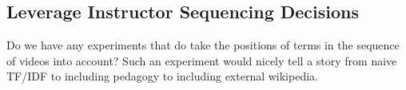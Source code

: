 \subsection{Leverage Instructor Sequencing Decisions}
\label{sec:useTime}

Do we have any experiments that do take the positions of terms in the
sequence of videos into account? Such an experiment would nicely tell
a story from naive TF/IDF to including pedagogy to including external
wikipedia.

